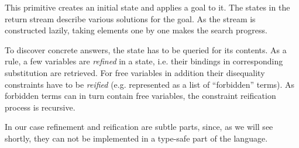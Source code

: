 This primitive creates an initial state and applies a goal to it. The states in the return stream describe
various solutions for the goal. As the stream is constructed lazily, taking elements one by one makes
the search progress.

To discover concrete answers, the state has to be queried for its contents. As a rule, a few variables
are \emph{refined} in a state, i.e. their bindings in corresponding substitution are retrieved. For free
variables in addition their disequality constraints have to be \emph{reified} (e.g. represented as a list of
``forbidden'' terms). As forbidden terms can in turn contain free variables, the constraint reification
process is recursive.

In our case refinement and reification are subtle parts, since, as we will see shortly, they can not be
implemented in a type-safe part of the language.

